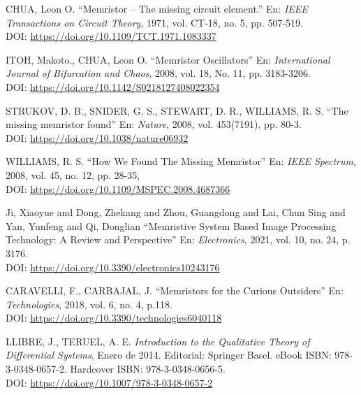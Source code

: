 \documentclass[12pt,a4paper]{report} %
\begin{document}
	\begin{thebibliography}{99}
		 CHUA, Leon O. ``Memristor – The missing circuit element.'' En: \textit{IEEE Transactions on Circuit Theory}, 1971, vol. CT-18, no. 5, pp. 507-519. \\DOI: \href{https://doi.org/10.1109/TCT.1971.1083337}{https://doi.org/10.1109/TCT.1971.1083337}
		
		 ITOH, Makoto., CHUA, Leon O. ``Memristor Oscillators'' En: \textit{International Journal of Bifurcation and Chaos}, 2008, vol. 18, No. 11, pp. 3183-3206. \\DOI: \href{https://doi.org/10.1142/S0218127408022354}{https://doi.org/10.1142/S0218127408022354}
		
		 STRUKOV, D. B., SNIDER, G. S., STEWART, D. R., WILLIAMS, R. S. ``The missing memristor found'' En: \textit{Nature}, 2008, vol. 453(7191), pp. 80-3. \\DOI: \href{https://doi.org/10.1038/nature06932}{https://doi.org/10.1038/nature06932}
	
		 WILLIAMS, R. S. ``How We Found The Missing Memristor'' En: \textit{IEEE Spectrum}, 2008, vol. 45, no. 12, pp. 28-35, \\DOI: \href{https://doi.org/10.1109/MSPEC.2008.4687366}{https://doi.org/10.1109/MSPEC.2008.4687366}
		
		 Ji, Xiaoyue and Dong, Zhekang and Zhou, Guangdong and Lai, Chun Sing and Yan, Yunfeng and Qi, Donglian ``Memristive System Based Image Processing Technology: A Review and Perspective'' En: \textit{Electronics}, 2021, vol. 10, no. 24, p. 3176. \\DOI: \href{https://doi.org/10.3390/electronics10243176}{https://doi.org/10.3390/electronics10243176}
		
		 CARAVELLI, F., CARBAJAL, J. ``Memristors for the Curious Outsiders'' En: \textit{Technologies}, 2018, vol. 6, no. 4, p.118. \\DOI: \href{https://doi.org/10.3390/technologies6040118}{https://doi.org/10.3390/technologies6040118}
		
		 LLIBRE, J., TERUEL, A. E. \textit{Introduction to the Qualitative Theory of Differential Systems}, Enero de 2014. Editorial: Springer Basel. eBook ISBN: 978-3-0348-0657-2. Hardcover ISBN: 978-3-0348-0656-5. \\DOI: \href{https://doi.org/10.1007/978-3-0348-0657-2}{https://doi.org/10.1007/978-3-0348-0657-2}
		

\end{thebibliography}
\end{document}
